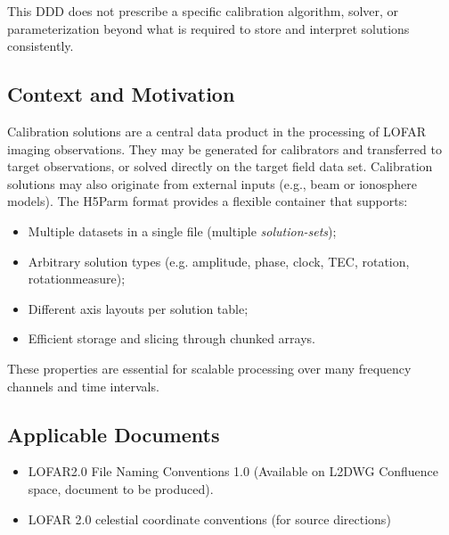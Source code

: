 \documentclass[a4paper,10pt,bibtotoc]{scrartcl}
\begin{document}
This DDD does not prescribe a specific calibration algorithm, solver, or parameterization beyond
what is required to store and interpret solutions consistently.

\subsection{Context and Motivation}
Calibration solutions are a central data product in the processing of LOFAR imaging observations. They may be
generated for calibrators and transferred to target observations, or solved directly on the target field data set. Calibration solutions may also originate from external inputs (e.g., beam or ionosphere models). The H5Parm format provides a flexible container that supports:
\begin{itemize}
  \item Multiple datasets in a single file (multiple \emph{solution-sets});
  \item Arbitrary solution types (e.g. amplitude, phase, clock, TEC, rotation, rotationmeasure);
  \item Different axis layouts per solution table;
  \item Efficient storage and slicing through chunked arrays.
\end{itemize}
These properties are essential for scalable processing over many frequency channels and time intervals.

\subsection{Applicable Documents}
\begin{itemize}
  \item LOFAR2.0 File Naming Conventions 1.0 (Available on L2DWG Confluence space, document to be produced).
  \item LOFAR 2.0 celestial coordinate conventions (for source directions)
\end{itemize}
\end{document}
